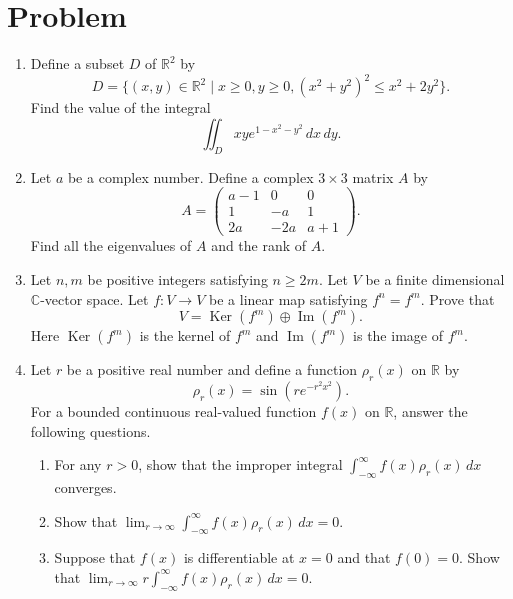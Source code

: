 \documentclass{article}
\begin{document}
\section*{Problem}
\begin{enumerate}[label=\fbox{\arabic*}]
  \item Define a subset $D$ of $\mathbb{R}^2$ by
        \[
          D = \{ (x, y) \in \mathbb{R}^2 \mid x \ge 0, y \ge 0, (x^2 + y^2)^2 \le x^2 + 2y^2 \}.
        \]
        Find the value of the integral
        \[
          \iint_D xy e^{1-x^2-y^2} \, dx \, dy.
        \]

  \item Let $a$ be a complex number. Define a complex $3 \times 3$ matrix $A$ by
        \[
          A = \begin{pmatrix}
          a-1 & 0 & 0 \\
          1 & -a & 1 \\
          2a & -2a & a+1
          \end{pmatrix}.
        \]
        Find all the eigenvalues of $A$ and the rank of $A$.

  \item Let $n, m$ be positive integers satisfying $n \ge 2m$. Let $V$ be a finite dimensional $\mathbb{C}$-vector space. Let $f : V \to V$ be a linear map satisfying $f^n = f^m$. Prove that
        \[
          V = \operatorname{Ker}(f^m) \oplus \operatorname{Im}(f^m).
        \]
        Here $\operatorname{Ker}(f^m)$ is the kernel of $f^m$ and $\operatorname{Im}(f^m)$ is the image of $f^m$.

  \item Let $r$ be a positive real number and define a function $\rho_r(x)$ on $\mathbb{R}$ by
        \[
          \rho_r(x) = \sin\left(r e^{-r^2 x^2}\right).
        \]
        For a bounded continuous real-valued function $f(x)$ on $\mathbb{R}$, answer the following questions.
        \begin{enumerate}[label=(\arabic*)]
          \item For any $r > 0$, show that the improper integral $\int_{-\infty}^\infty f(x) \rho_r(x) \, dx$ converges.
          \item Show that $\lim_{r \to \infty} \int_{-\infty}^\infty f(x) \rho_r(x) \, dx = 0$.
          \item Suppose that $f(x)$ is differentiable at $x = 0$ and that $f(0) = 0$. Show that $\lim_{r \to \infty} r \int_{-\infty}^\infty f(x) \rho_r(x) \, dx = 0$.
        \end{enumerate}


\end{enumerate}
\end{document}
